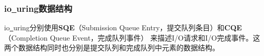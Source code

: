 \documentclass[supercite]{HustGraduPaper}
\theoremstyle{definition}
\begin{document}
\subsubsection{io\underline{~}uring数据结构}
io\underline{~}uring分别使用\textbf{SQE}（Submission Queue Entry，提交队列条目）和\textbf{CQE}（Completion Queue Event，完成队列事件）
来描述I/O请求和I/O完成事件。这两个数据结构同时也分别是提交队列和完成队列中元素的数据结构。\par

%
%
%
%
%
%
\end{document}

